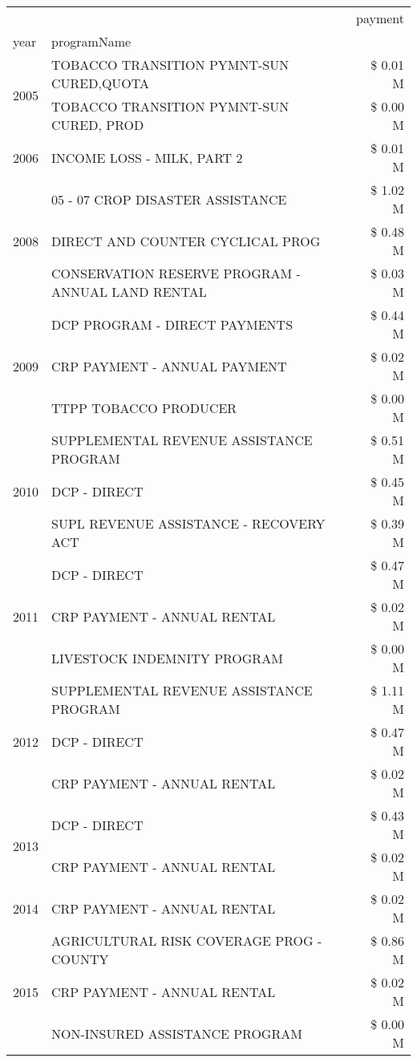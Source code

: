 \begin{tabular}{llr}
\toprule
 &  & payment \\
year & programName &  \\
\midrule
\multirow[t]{2}{*}{2005} & TOBACCO TRANSITION PYMNT-SUN CURED,QUOTA & \$ 0.01 M \\
 & TOBACCO TRANSITION PYMNT-SUN CURED, PROD & \$ 0.00 M \\
\cline{1-3}
2006 & INCOME LOSS - MILK, PART 2 & \$ 0.01 M \\
\cline{1-3}
\multirow[t]{3}{*}{2008} & 05 - 07 CROP DISASTER ASSISTANCE & \$ 1.02 M \\
 & DIRECT AND COUNTER CYCLICAL PROG & \$ 0.48 M \\
 & CONSERVATION RESERVE PROGRAM - ANNUAL LAND RENTAL & \$ 0.03 M \\
\cline{1-3}
\multirow[t]{3}{*}{2009} & DCP PROGRAM - DIRECT PAYMENTS & \$ 0.44 M \\
 & CRP PAYMENT - ANNUAL PAYMENT & \$ 0.02 M \\
 & TTPP TOBACCO PRODUCER & \$ 0.00 M \\
\cline{1-3}
\multirow[t]{3}{*}{2010} & SUPPLEMENTAL REVENUE ASSISTANCE PROGRAM & \$ 0.51 M \\
 & DCP - DIRECT & \$ 0.45 M \\
 & SUPL REVENUE ASSISTANCE - RECOVERY ACT & \$ 0.39 M \\
\cline{1-3}
\multirow[t]{3}{*}{2011} & DCP - DIRECT & \$ 0.47 M \\
 & CRP PAYMENT - ANNUAL RENTAL & \$ 0.02 M \\
 & LIVESTOCK INDEMNITY PROGRAM & \$ 0.00 M \\
\cline{1-3}
\multirow[t]{3}{*}{2012} & SUPPLEMENTAL REVENUE ASSISTANCE PROGRAM & \$ 1.11 M \\
 & DCP - DIRECT & \$ 0.47 M \\
 & CRP PAYMENT - ANNUAL RENTAL & \$ 0.02 M \\
\cline{1-3}
\multirow[t]{2}{*}{2013} & DCP - DIRECT & \$ 0.43 M \\
 & CRP PAYMENT - ANNUAL RENTAL & \$ 0.02 M \\
\cline{1-3}
2014 & CRP PAYMENT - ANNUAL RENTAL & \$ 0.02 M \\
\cline{1-3}
\multirow[t]{3}{*}{2015} & AGRICULTURAL RISK COVERAGE PROG - COUNTY & \$ 0.86 M \\
 & CRP PAYMENT - ANNUAL RENTAL & \$ 0.02 M \\
 & NON-INSURED ASSISTANCE PROGRAM & \$ 0.00 M \\

\end{tabular}
